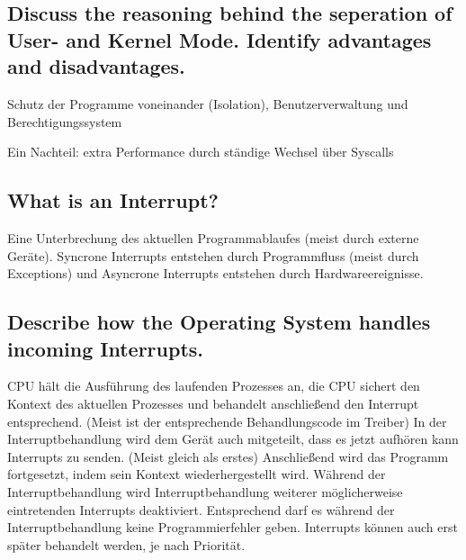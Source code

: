 \subsection{Discuss the reasoning behind the seperation of User- and Kernel Mode. Identify advantages and disadvantages.}
Schutz der Programme voneinander (Isolation), Benutzerverwaltung und Berechtigungssystem

Ein Nachteil: extra Performance durch ständige Wechsel über Syscalls

\subsection{What is an Interrupt?}
Eine Unterbrechung des aktuellen Programmablaufes (meist durch externe Geräte).
Syncrone Interrupts entstehen durch Programmfluss (meist durch Exceptions) und Asyncrone Interrupts entstehen durch Hardwareereignisse.

\subsection{Describe how the Operating System handles incoming Interrupts.}
CPU hält die Ausführung des laufenden Prozesses an, die CPU sichert den Kontext des aktuellen Prozesses und  behandelt anschließend den Interrupt entsprechend.
(Meist ist der entsprechende Behandlungscode im Treiber)
In der Interruptbehandlung wird dem Gerät auch mitgeteilt, dass es jetzt aufhören kann Interrupts zu senden.
(Meist gleich als erstes)
Anschließend wird das Programm fortgesetzt, indem sein Kontext wiederhergestellt wird.
Während der Interruptbehandlung wird Interruptbehandlung weiterer möglicherweise eintretenden Interrupts deaktiviert.
Entsprechend darf es während der Interruptbehandlung keine Programmierfehler geben.
Interrupts können auch erst später behandelt werden, je nach Priorität.
